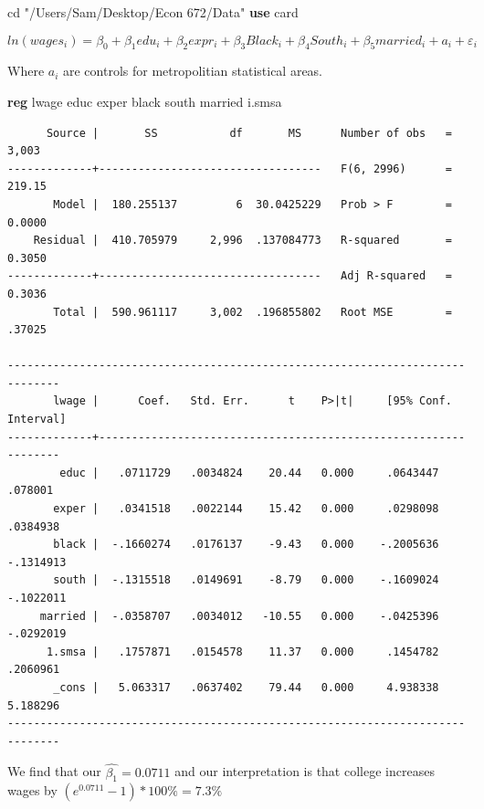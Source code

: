 \documentclass[
]{book}
\newenvironment{Shaded}{\begin{snugshade}}{\end{snugshade}}
\newcommand{\BaseNTok}[1]{\textcolor[rgb]{0.00,0.00,0.81}{#1}}
\newcommand{\KeywordTok}[1]{\textcolor[rgb]{0.13,0.29,0.53}{\textbf{#1}}}
\newcommand{\NormalTok}[1]{#1}
\newcommand{\StringTok}[1]{\textcolor[rgb]{0.31,0.60,0.02}{#1}}
\begin{document}
\begin{Shaded}
\begin{Highlighting}[]
\NormalTok{cd }\StringTok{"/Users/Sam/Desktop/Econ 672/Data"}
\KeywordTok{use}\NormalTok{ card}
\end{Highlighting}
\end{Shaded}

\[ ln(wages_i)= \beta_0 + \beta_1 edu_i + \beta_2 expr_i + \beta_3 Black_i + \beta_4 South_i + \beta_5 married_i + a_i + \varepsilon_i \]

Where \(a_i\) are controls for metropolitian statistical areas.

\begin{Shaded}
\begin{Highlighting}[]
\KeywordTok{reg}\NormalTok{ lwage  educ  exper }\BaseNTok{black}\NormalTok{ south married i.smsa}
\end{Highlighting}
\end{Shaded}

\begin{verbatim}
      Source |       SS           df       MS      Number of obs   =     3,003
-------------+----------------------------------   F(6, 2996)      =    219.15
       Model |  180.255137         6  30.0425229   Prob > F        =    0.0000
    Residual |  410.705979     2,996  .137084773   R-squared       =    0.3050
-------------+----------------------------------   Adj R-squared   =    0.3036
       Total |  590.961117     3,002  .196855802   Root MSE        =    .37025

------------------------------------------------------------------------------
       lwage |      Coef.   Std. Err.      t    P>|t|     [95% Conf. Interval]
-------------+----------------------------------------------------------------
        educ |   .0711729   .0034824    20.44   0.000     .0643447     .078001
       exper |   .0341518   .0022144    15.42   0.000     .0298098    .0384938
       black |  -.1660274   .0176137    -9.43   0.000    -.2005636   -.1314913
       south |  -.1315518   .0149691    -8.79   0.000    -.1609024   -.1022011
     married |  -.0358707   .0034012   -10.55   0.000    -.0425396   -.0292019
      1.smsa |   .1757871   .0154578    11.37   0.000     .1454782    .2060961
       _cons |   5.063317   .0637402    79.44   0.000     4.938338    5.188296
------------------------------------------------------------------------------
\end{verbatim}

We find that our \(\hat{\beta_1}=0.0711\) and our interpretation is that college increases wages by \((e^{0.0711}-1)*100\%=7.3\%\)
\end{document}
